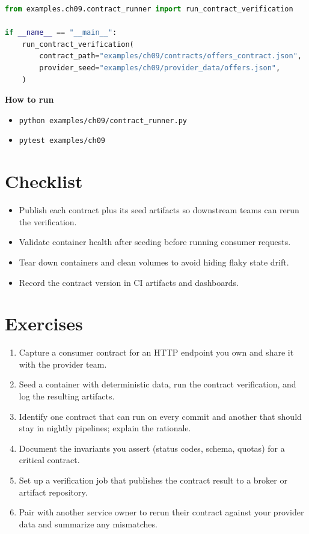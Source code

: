 \begin{lstlisting}[language=python, caption={Contract verification runner.}, label=lst:ch09-contract-runner]
from examples.ch09.contract_runner import run_contract_verification

if __name__ == "__main__":
    run_contract_verification(
        contract_path="examples/ch09/contracts/offers_contract.json",
        provider_seed="examples/ch09/provider_data/offers.json",
    )
\end{lstlisting}

\textbf{How to run}
\begin{itemize}
  \item \texttt{python examples/ch09/contract\_runner.py}
  \item \texttt{pytest examples/ch09}
\end{itemize}

\section{Checklist}
\begin{itemize}
  \item Publish each contract plus its seed artifacts so downstream teams can rerun the verification.
  \item Validate container health after seeding before running consumer requests.
  \item Tear down containers and clean volumes to avoid hiding flaky state drift.
  \item Record the contract version in CI artifacts and dashboards.
\end{itemize}

\section{Exercises}
\begin{enumerate}
  \item Capture a consumer contract for an HTTP endpoint you own and share it with the provider team.
  \item Seed a container with deterministic data, run the contract verification, and log the resulting artifacts.
  \item Identify one contract that can run on every commit and another that should stay in nightly pipelines; explain the rationale.
  \item Document the invariants you assert (status codes, schema, quotas) for a critical contract.
  \item Set up a verification job that publishes the contract result to a broker or artifact repository.
  \item Pair with another service owner to rerun their contract against your provider data and summarize any mismatches.
\end{enumerate}

